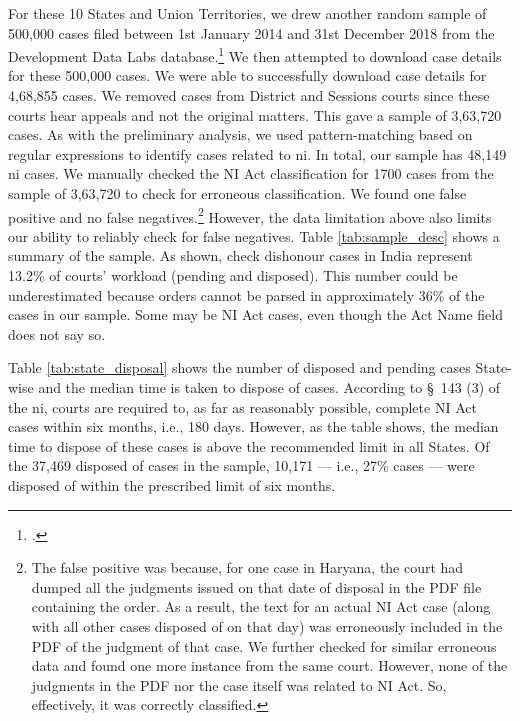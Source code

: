 \documentclass[12pt,a4paper]{article}
\begin{document}
For these 10 States and Union Territories, we drew another random sample of 500,000 cases filed between 1st January 2014 and 31st December 2018 from the Development Data Labs database.\footcite{devdatalabs2021_eCourtsData} We then attempted to download case details for these 500,000 cases. We were able to successfully download case details for 4,68,855 cases. We removed cases from District and Sessions courts since these courts hear appeals and not the original matters. This gave a sample of 3,63,720 cases. As with the preliminary analysis, we used pattern-matching based on regular expressions to identify cases related to \gls{ni}. In total, our sample has 48,149 \gls{ni} cases. We manually checked the NI Act classification for 1700 cases from the sample of 3,63,720 to check for erroneous classification. We found one false positive and no false negatives.\footnote{The false positive was because, for one case in Haryana, the court had dumped all the judgments issued on that date of disposal in the PDF file containing the order. As a result, the text for an actual NI Act case (along with all other cases disposed of on that day) was erroneously included in the PDF of the judgment of that case. We further checked for similar erroneous data and found one more instance from the same court. However, none of the judgments in the PDF nor the case itself was related to NI Act. So, effectively, it was correctly classified.} However, the data limitation above also limits our ability to reliably check for false negatives. Table \ref{tab:sample_desc} shows a summary of the sample. As shown, check dishonour cases in India represent 13.2\% of courts' workload (pending and disposed). This number could be underestimated because orders cannot be parsed in approximately 36\% of the cases in our sample. Some may be NI Act cases, even though the Act Name field does not say so.

Table \ref{tab:state_disposal} shows the number of disposed and pending cases State-wise and the median time is taken to dispose of cases. According to \S~143 (3) of the \gls{ni}, courts are required to, as far as reasonably possible, complete NI Act cases within six months, i.e., 180 days. However, as the table shows, the median time to dispose of these cases is above the recommended limit in all States. Of the 37,469 disposed of cases in the sample, 10,171 --- i.e., 27\% cases --- were disposed of within the prescribed limit of six months.
\end{document}
